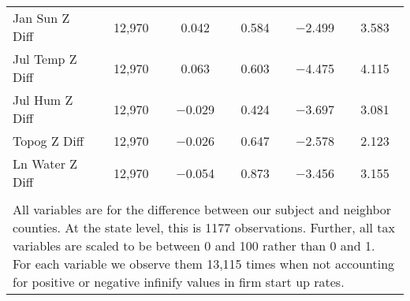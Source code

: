 \begin{table}[!htbp]
\begin{tabular}{@{\extracolsep{5pt}}lccccc}
Jan Sun Z Diff & 12,970 & 0.042 & 0.584 & $-$2.499 & 3.583 \\ 
Jul Temp Z Diff & 12,970 & 0.063 & 0.603 & $-$4.475 & 4.115 \\ 
Jul Hum Z Diff & 12,970 & $-$0.029 & 0.424 & $-$3.697 & 3.081 \\ 
Topog Z Diff & 12,970 & $-$0.026 & 0.647 & $-$2.578 & 2.123 \\ 
Ln Water Z Diff & 12,970 & $-$0.054 & 0.873 & $-$3.456 & 3.155 \\ 
\hline \\[-1.8ex] 
\multicolumn{6}{l}{All variables are for the difference between our subject and neighbor counties. At the state level, this is 1177 observations. Further, all tax variables are scaled to be between 0 and 100 rather than 0 and 1. For each variable we observe them 13,115 times when not accounting for positive or negative infinify values in firm start up rates.} \\ 
\end{tabular} 
\end{table} 
